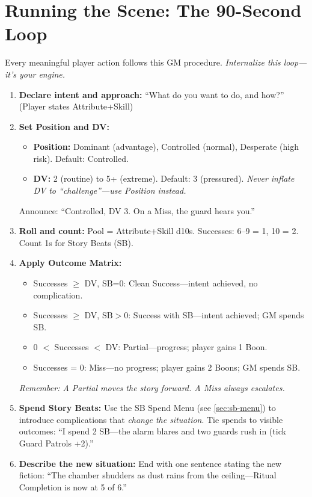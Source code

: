 \section{Running the Scene: The 90-Second Loop}
Every meaningful player action follows this GM procedure. \textit{Internalize this loop---it's your engine.}

\begin{enumerate}
  \item \textbf{Declare intent and approach:} ``What do you want to do, and how?'' (Player states Attribute+Skill)
  \item \textbf{Set Position and DV:} 
    \begin{itemize}
      \item \textbf{Position:} Dominant (advantage), Controlled (normal), Desperate (high risk). Default: Controlled.
      \item \textbf{DV:} 2 (routine) to 5+ (extreme). Default: 3 (pressured). \textit{Never inflate DV to ``challenge''---use Position instead.}
    \end{itemize}
    Announce: ``Controlled, DV 3. On a Miss, the guard hears you.''
  \item \textbf{Roll and count:} Pool = Attribute+Skill d10s. Successes: 6--9 = 1, 10 = 2. Count 1s for Story Beats (SB).
  \item \textbf{Apply Outcome Matrix:} 
    \begin{itemize}
      \item Successes $\geq$ DV, SB=0: Clean Success---intent achieved, no complication.
      \item Successes $\geq$ DV, SB$>$0: Success with SB---intent achieved; GM spends SB.
      \item 0 $<$ Successes $<$ DV: Partial---progress; player gains 1 Boon.
      \item Successes = 0: Miss---no progress; player gains 2 Boons; GM spends SB.
    \end{itemize}
    \textit{Remember: A Partial moves the story forward. A Miss always escalates.}
  \item \textbf{Spend Story Beats:} Use the SB Spend Menu (see \ref{sec:sb-menu}) to introduce complications that \textit{change the situation}. Tie spends to visible outcomes: ``I spend 2 SB---the alarm blares and two guards rush in (tick Guard Patrols +2).''
  \item \textbf{Describe the new situation:} End with one sentence stating the new fiction: ``The chamber shudders as dust rains from the ceiling---Ritual Completion is now at 5 of 6.''
\end{enumerate}

